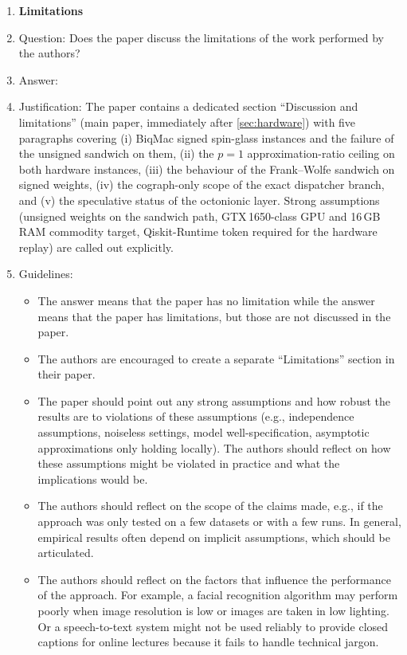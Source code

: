 \begin{enumerate}
\item {\bf Limitations}
    \item[] Question: Does the paper discuss the limitations of the work performed by the authors?
    \item[] Answer: \answerYes{} %
    \item[] Justification: The paper contains a dedicated section
        ``Discussion and limitations'' (main paper, immediately after
        \cref{sec:hardware}) with five paragraphs covering
        (i) BiqMac signed spin-glass instances and the failure of the
        unsigned sandwich on them, (ii) the \QAOA $p{=}1$ approximation-ratio
        ceiling on both hardware instances, (iii) the behaviour of the
        Frank--Wolfe sandwich on signed weights, (iv) the cograph-only
        scope of the exact dispatcher branch, and (v) the speculative
        status of the octonionic layer. Strong assumptions (unsigned
        weights on the sandwich path, GTX\,1650-class GPU and 16\,GB RAM
        commodity target, Qiskit-Runtime token required for the hardware
        replay) are called out explicitly.
    \item[] Guidelines:
    \begin{itemize}
        \item The answer \answerNA{} means that the paper has no limitation while the answer \answerNo{} means that the paper has limitations, but those are not discussed in the paper.
        \item The authors are encouraged to create a separate ``Limitations'' section in their paper.
        \item The paper should point out any strong assumptions and how robust the results are to violations of these assumptions (e.g., independence assumptions, noiseless settings, model well-specification, asymptotic approximations only holding locally). The authors should reflect on how these assumptions might be violated in practice and what the implications would be.
        \item The authors should reflect on the scope of the claims made, e.g., if the approach was only tested on a few datasets or with a few runs. In general, empirical results often depend on implicit assumptions, which should be articulated.
        \item The authors should reflect on the factors that influence the performance of the approach. For example, a facial recognition algorithm may perform poorly when image resolution is low or images are taken in low lighting. Or a speech-to-text system might not be used reliably to provide closed captions for online lectures because it fails to handle technical jargon.

\end{itemize}
\end{enumerate}
